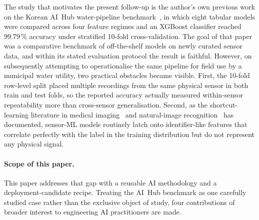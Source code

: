 \documentclass[3p,times,authoryear]{elsarticle}
\theoremstyle{remark}
\begin{document}
The study that motivates the present follow-up is the author's
own previous work on the Korean AI~Hub water-pipeline
benchmark~\cite{lee2023leak}, in which eight tabular models were
compared across four feature regimes and an XGBoost classifier
reached 99.79\,\% accuracy under stratified 10-fold
cross-validation. The goal of that paper was a comparative
benchmark of off-the-shelf models on newly curated sensor data,
and within its stated evaluation protocol the result is faithful.
However, on subsequently attempting to operationalise the same
pipeline for field use by a municipal water utility, two
practical obstacles became visible. First, the 10-fold row-level
split placed multiple recordings from the same physical sensor in
both train and test folds, so the reported accuracy actually
measured within-sensor repeatability more than cross-sensor
generalisation. Second, as the shortcut-learning literature in
medical imaging~\cite{zech2018pneumonia,degrave2021covid,
geirhos2020shortcut,damour2022underspec} and natural-image
recognition~\cite{beery2018terra} has documented, sensor-ML
models routinely latch onto identifier-like features that
correlate perfectly with the label in the training distribution
but do not represent any physical signal.

\paragraph{Scope of this paper.}
This paper addresses that gap with a reusable AI methodology
and a deployment-candidate recipe. Treating the AI~Hub benchmark as
one carefully studied case rather than the exclusive object of
study, four contributions of broader interest to engineering AI
practitioners are made.
\end{document}
